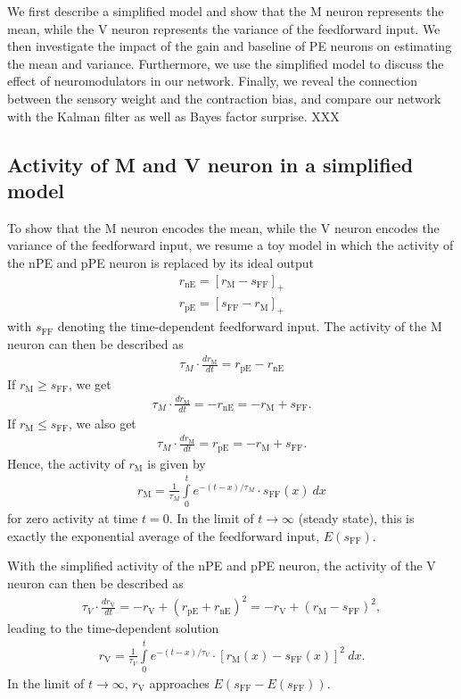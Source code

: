\documentclass[10pt,a4paper,draft]{article}
\begin{document}
We first describe a simplified model and show that the M neuron represents the mean, while the V neuron represents the variance of the feedforward input. We then investigate the impact of the gain and baseline of PE neurons on estimating the mean and variance. Furthermore, we use the simplified model to discuss the effect of neuromodulators in our network. Finally, we reveal the connection between the sensory weight and the contraction bias, and compare our network with the Kalman filter as well as Bayes factor surprise. XXX

\subsection{Activity of M and V neuron in a simplified model}\label{sec:toy}
%
To show that the M neuron encodes the mean, while the V neuron encodes the variance of the feedforward input, we resume a toy model in which the activity of the nPE and pPE neuron is replaced by its ideal output
%
\begin{align}
r_\mathrm{nE} = \left[ r_\mathrm{M} - s_\mathrm{FF}\right]_+ \nonumber \\
r_\mathrm{pE} = \left[ s_\mathrm{FF} - r_\mathrm{M} \right]_+
\end{align}
%
with $s_\mathrm{FF}$ denoting the time-dependent feedforward input. The activity of the M neuron can then be described as
%
\begin{align}
\tau_M \cdot \frac{dr_\mathrm{M}}{dt} = r_\mathrm{pE} - r_\mathrm{nE}
\end{align}
%
If $r_\mathrm{M} \geq s_\mathrm{FF}$, we get
%
\begin{align}
\tau_M \cdot \frac{dr_\mathrm{M}}{dt} = -r_\mathrm{nE} = -r_\mathrm{M} + s_\mathrm{FF}.
\end{align}
%
If $r_\mathrm{M} \leq s_\mathrm{FF}$, we also get
%
\begin{align}
\tau_M \cdot \frac{dr_\mathrm{M}}{dt} = r_\mathrm{pE} = -r_\mathrm{M} + s_\mathrm{FF}.\nonumber
\end{align}
%
Hence, the activity of $r_\mathrm{M}$ is given by
%
\begin{align}
r_\mathrm{M} = \frac{1}{\tau_M} \int\limits_0^t e^{-(t-x)/\tau_M}\cdot s_\mathrm{FF}(x)\ dx
\end{align}  
%
for zero activity at time $t=0$. In the limit of $t\rightarrow \infty$ (steady state), this is exactly the exponential average of the feedforward input, $E(s_\mathrm{FF})$.

With the simplified activity of the nPE and pPE neuron, the activity of the V neuron can then be described as
%
\begin{align}
\tau_V \cdot \frac{dr_\mathrm{V}}{dt} = -r_\mathrm{V} + (r_\mathrm{pE} +  r_\mathrm{nE})^2 = -r_\mathrm{V}  + (r_\mathrm{M} -  s_\mathrm{FF})^2,
\end{align}
%
leading to the time-dependent solution
%
\begin{align}
r_\mathrm{V} = \frac{1}{\tau_V} \int\limits_0^t e^{-(t-x)/\tau_V}\cdot \left[r_\mathrm{M}(x) -  s_\mathrm{FF}(x)\right]^2\ dx.
\end{align}  
%
In the limit of $t\rightarrow \infty$, $r_\mathrm{V}$ approaches $E(s_\mathrm{FF} - E(s_\mathrm{FF}))$.
\end{document}
